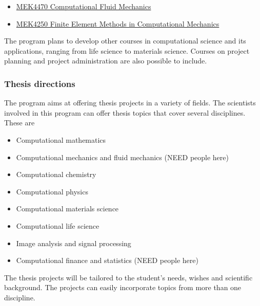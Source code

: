 \documentclass{beamer}
\begin{document}
\begin{frame}
\begin{block}{}
\begin{itemize}
\item \href{{http://www.uio.no/studier/emner/matnat/math/MEK4470/index-eng.html}}{MEK4470  Computational Fluid Mechanics}

\item \href{{http://www.uio.no/studier/emner/matnat/math/MEK4250/index-eng.html}}{MEK4250 Finite Element Methods in Computational Mechanics}
\end{itemize}

\noindent
The program plans to develop other courses in computational science and its applications, ranging from life science to materials science.
Courses on project planning and project administration are also possible to include.
\end{block}
\end{frame}

\begin{frame}
\frametitle{Thesis directions}

\begin{block}{}
The program aims at offering thesis projects in a variety of fields. The scientists involved in this program can offer thesis
topics that cover several disciplines. These are

\begin{itemize}
\item Computational mathematics

\item Computational mechanics and fluid mechanics  (NEED people here)

\item Computational chemistry

\item Computational physics

\item Computational materials science

\item Computational life science

\item Image analysis and signal processing

\item Computational finance and statistics   (NEED people here)
\end{itemize}

\noindent
The thesis projects will be tailored to the student's needs, wishes and scientific background. The projects can easily incorporate topics from more than one discipline.
\end{block}
\end{frame}
\end{document}
